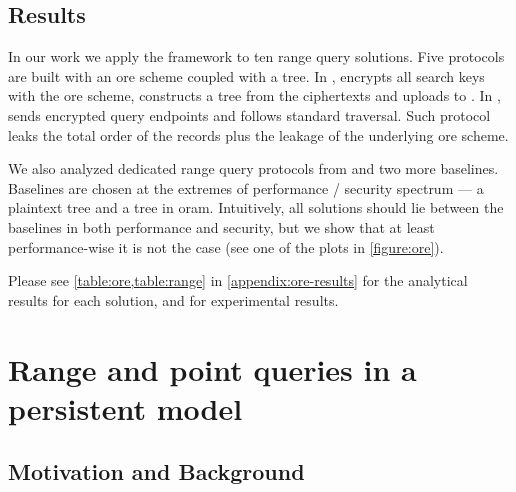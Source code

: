 		\subsection{Results}

			In our work we apply the framework to ten range query solutions.
			Five protocols are built with an \acrfull{ore} scheme coupled with a \BPlus{} tree.
			In \protocolSetup{}, \client{} encrypts all search keys with the \acrshort{ore} scheme, constructs a \BPlus{} tree from the ciphertexts and uploads to \server{}.
			In \protocolQuery{}, \client{} sends encrypted query endpoints and \server{} follows standard \BPlus{} traversal.
			Such protocol leaks the total order of the records plus the leakage of the underlying \acrshort{ore} scheme.

			We also analyzed dedicated range query protocols from \cite{florian-protocol,pope,practical-range-search} and two more baselines.
			Baselines are chosen at the extremes of performance / security spectrum --- a plaintext \BPlus{} tree and a \BPlus{} tree in \acrshort{oram}.
			Intuitively, all solutions should lie between the baselines in both performance and security, but we show that at least performance-wise it is not the case (see one of the plots in \cref{figure:ore}).

			Please see \cref{table:ore,table:range} in \cref{appendix:ore-results} for the analytical results for each solution, and \cite{ore-benchmark-17} for experimental results.

			

	\section{Range and point queries in a persistent model}\label{section:range-queries-persistent}

		\subsection{Motivation and Background}


